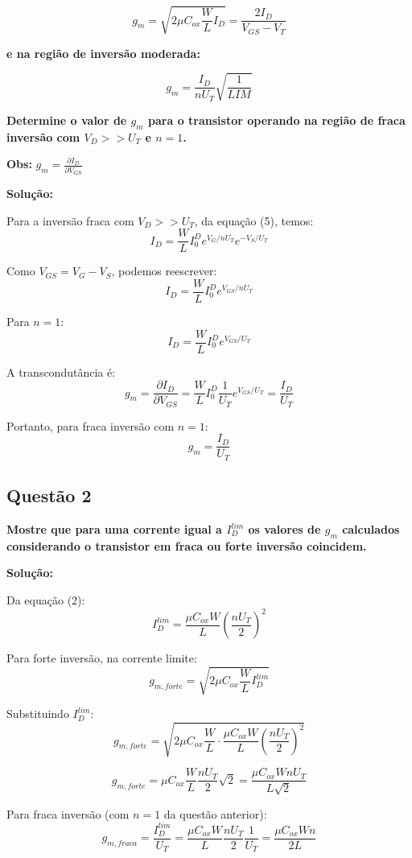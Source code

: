 ﻿\documentclass[12pt,a4paper]{article}
\begin{document}
\begin{equation}
g_m = \sqrt{2\mu C_{ox} \frac{W}{L} I_D} = \frac{2I_D}{V_{GS} - V_T}
\end{equation}

\textbf{e na região de inversão moderada:}

\begin{equation}
g_m = \frac{I_D}{nU_T} \sqrt{\frac{1}{LIM}}
\end{equation}

\textbf{Determine o valor de $g_m$ para o transistor operando na região de fraca inversão com $V_D >> U_T$ e $n = 1$.}

\textbf{Obs:} $g_m = \frac{\partial I_D}{\partial V_{GS}}$

\textbf{Solução:}

Para a inversão fraca com $V_D >> U_T$, da equação (5), temos:
$$I_D = \frac{W}{L} I_0^D e^{V_G/nU_T} e^{-V_S/U_T}$$

Como $V_{GS} = V_G - V_S$, podemos reescrever:
$$I_D = \frac{W}{L} I_0^D e^{V_{GS}/nU_T}$$

Para $n = 1$:
$$I_D = \frac{W}{L} I_0^D e^{V_{GS}/U_T}$$

A transcondutância é:
$$g_m = \frac{\partial I_D}{\partial V_{GS}} = \frac{W}{L} I_0^D \frac{1}{U_T} e^{V_{GS}/U_T} = \frac{I_D}{U_T}$$

Portanto, para fraca inversão com $n = 1$:
$$\boxed{g_m = \frac{I_D}{U_T}}$$

\subsection*{Questão 2}
\textbf{Mostre que para uma corrente igual a $I_{D}^{lim}$ os valores de $g_m$ calculados considerando o transistor em fraca ou forte inversão coincidem.}

\textbf{Solução:}

Da equação (2):
$$I_{D}^{lim} = \frac{\mu C_{ox} W}{L} \left(\frac{nU_T}{2}\right)^2$$

Para forte inversão, na corrente limite:
$$g_{m,forte} = \sqrt{2\mu C_{ox} \frac{W}{L} I_{D}^{lim}}$$

Substituindo $I_{D}^{lim}$:
$$g_{m,forte} = \sqrt{2\mu C_{ox} \frac{W}{L} \cdot \frac{\mu C_{ox} W}{L} \left(\frac{nU_T}{2}\right)^2}$$

$$g_{m,forte} = \mu C_{ox} \frac{W}{L} \frac{nU_T}{2} \sqrt{2} = \frac{\mu C_{ox} W nU_T}{L\sqrt{2}}$$

Para fraca inversão (com $n = 1$ da questão anterior):
$$g_{m,fraca} = \frac{I_{D}^{lim}}{U_T} = \frac{\mu C_{ox} W}{L} \frac{nU_T}{2} \frac{1}{U_T} = \frac{\mu C_{ox} W n}{2L}$$
\end{document}

